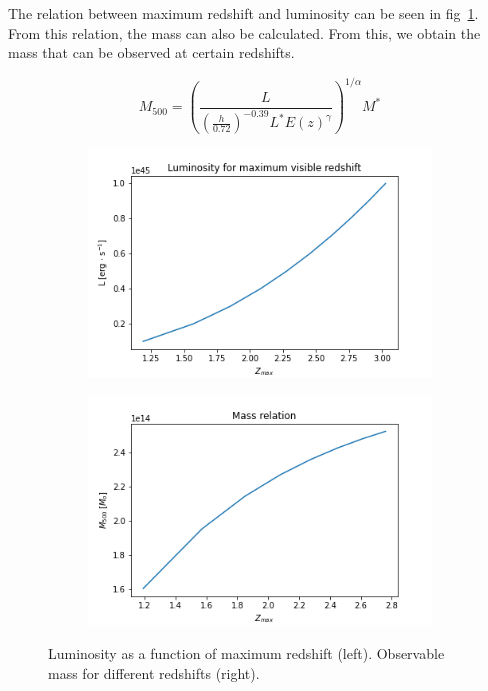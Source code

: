 \documentclass[12pt]{article}
\begin{document}
The relation between maximum redshift and luminosity can be seen in fig~\ref{fig:zmax}. From this relation, the mass can also be calculated. From this, we obtain the mass that can be observed at certain redshifts.

\begin{equation}
	M_{500} = \left( \frac{L}{\left( \frac{h}{0.72} \right)^{-0.39} L^{*} E(z)^{\gamma}} \right)^{1/\alpha} M^{*}
	\label{eq:massLuminosity}
\end{equation}

\begin{figure}[ht]
	\centering
	\begin{subfigure}[b]{0.49\textwidth}
		\centering
		\includegraphics[width=\textwidth]{luminosityZmax.png}
	\end{subfigure}
	\hfill
	\begin{subfigure}[b]{0.49\textwidth}
		\centering
		\includegraphics[width=\textwidth]{massZmax.png}
	\end{subfigure}
	\caption{Luminosity as a function of maximum redshift (left). Observable mass for different redshifts (right).}
	\label{fig:zmax}
\end{figure}
\end{document}
